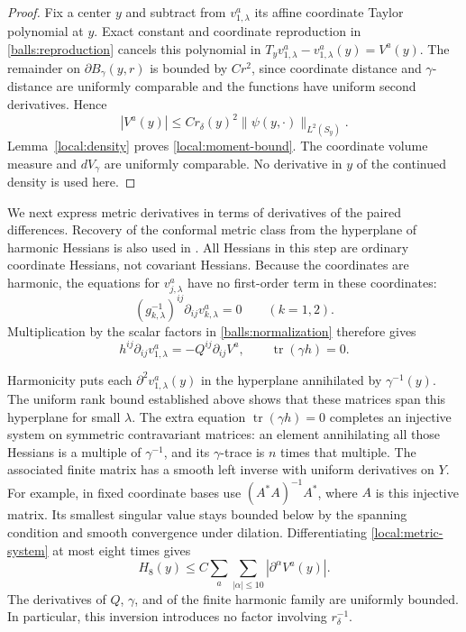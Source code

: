 \documentclass[11pt]{article}
\theoremstyle{definition}
\theoremstyle{remark}
\numberwithin{equation}{section}
\begin{document}
\begin{proof}
Fix a center $y$ and subtract from $v_{1,\lambda}^a$ its affine
coordinate Taylor polynomial at $y$.  Exact constant and coordinate
reproduction in \eqref{balls:reproduction} cancels this polynomial in
$T_yv_{1,\lambda}^a-v_{1,\lambda}^a(y)=V^a(y)$.  The remainder on
$\partial B_\gamma(y,r)$ is bounded by $Cr^2$, since coordinate
distance and $\gamma$-distance are uniformly comparable and the
functions have uniform second derivatives.  Hence
\[
 |V^a(y)|\leq C r_\delta(y)^2
                         \|\psi(y,\cdot)\|_{L^2(S_y)}.
\]
Lemma~\ref{local:density} proves \eqref{local:moment-bound}.  The
coordinate volume measure and $dV_\gamma$ are uniformly comparable.
No derivative in $y$ of the continued density is used here.
\end{proof}

We next express metric derivatives in terms of derivatives of the paired
differences.  Recovery of the conformal metric
class from the hyperplane of harmonic Hessians is also used in
\citep[Proposition~4.1 and Remark~4.2]{LLS20}.
All Hessians in this step are
ordinary coordinate Hessians, not covariant Hessians.  Because the
coordinates are harmonic, the equations for $v_{j,\lambda}^a$ have
no first-order term in these coordinates:
\[
 (g_{k,\lambda}^{-1})^{ij}\partial_{ij}v_{k,\lambda}^a=0
 \qquad(k=1,2).
\]
Multiplication by the scalar factors in
\eqref{balls:normalization} therefore gives
\begin{equation}\label{local:metric-system}
 h^{ij}\partial_{ij}v_{1,\lambda}^a
       =-Q^{ij}\partial_{ij}V^a,
 \qquad \operatorname{tr}(\gamma h)=0.
\end{equation}

Harmonicity puts each $\partial^2v_{1,\lambda}^a(y)$ in the hyperplane
annihilated by $\gamma^{-1}(y)$.  The uniform rank bound established
above shows that these matrices span this hyperplane for small $\lambda$.  The extra equation
$\operatorname{tr}(\gamma h)=0$ completes an injective system on
symmetric contravariant matrices: an element annihilating all those
Hessians is a multiple of $\gamma^{-1}$, and its $\gamma$-trace is
$n$ times that multiple.  The associated finite matrix has a smooth
left inverse with uniform derivatives on $Y$.  For example, in fixed
coordinate bases use $(A^*A)^{-1}A^*$, where $A$ is this injective
matrix.  Its smallest singular value stays bounded below by the
spanning condition and smooth convergence under dilation.
Differentiating \eqref{local:metric-system} at most eight times gives
\begin{equation}\label{local:metric-jet-bound}
 H_8(y)\leq C\sum_a\sum_{|\alpha|\leq10}
                              |\partial^\alpha V^a(y)|.
\end{equation}
The derivatives of $Q$, $\gamma$, and of the finite harmonic family
are uniformly bounded.  In particular, this inversion introduces no
factor involving $r_\delta^{-1}$.
\end{document}
